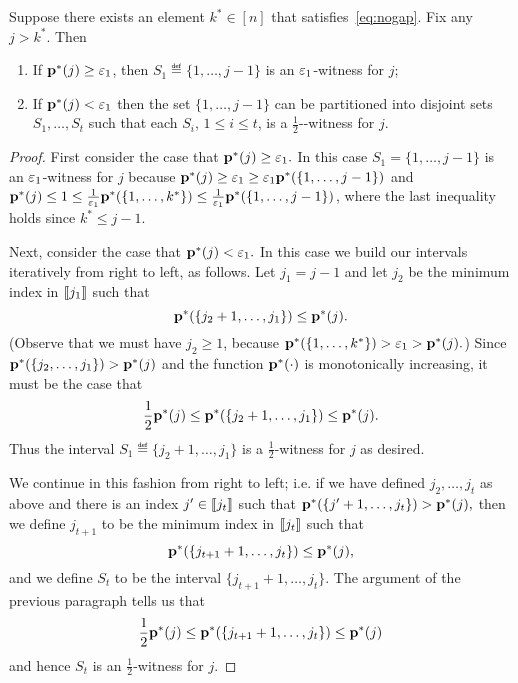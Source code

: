 \begin{claim} \label{claim:partition}
Suppose there exists an element $k^\ast \in [n]$
that satisfies~\cref{eq:nogap}.
Fix any $j > k^\ast.$  Then

\begin{enumerate}
\item If $\D^\ast(j) \geq {\eps_1}$, then $S_1 \eqdef \{1,\dots,j-1\}$ is an
${\varepsilon_1}$-\good witness for $j$;
\item If $\mathbf{p}^\ast(j) < {\varepsilon_1}$ then the set $\{1,\dots,j-1\}$ can be partitioned
into disjoint sets $S_1,\dots,S_t$ such that each
$S_i$, $1 \leq i \leq t$, is a ${\frac{1}2}$-\good-witness for $j$.
\end{enumerate}

\end{claim}
\begin{proof}
First consider the case that $\D^\ast(j)\geq {\eps_1}.$  In this case $S_1=\{1,\dots,j-1\}$  is an ${\varepsilon_1}$-\good witness
for $j$ because $\D^\ast(j) \geq {\eps_1} \geq {\eps_1} \D^\ast(\{1,\dots,j-1\})$
and $\D^\ast(j) \leq 1 \leq {\frac{1}{{\eps_1}}} \D^\ast(\{1,\dots,k^\ast\}) \leq {\frac{1}{{\eps_1}}} \D^\ast(\{1,\dots,j-1\})$,
where the last inequality holds since $k^\ast \leq j-1$.

Next, consider the case that $\mathbf{p}^\ast(j) < {\varepsilon_1}.$  In this case we build our
intervals iteratively from right to left, as follows.  Let $j_1=j-1$
and let $j_2$ be the minimum index in $\llbracket j_1\rrbracket$
such that
\[ \mathbf{p}^\ast(\{j_2+1,\dots,j_1\}) \leq \mathbf{p}^\ast(j). \]
(Observe that we must have $j_2 \geq 1$, because $\mathbf{p}^\ast(\{1,\dots,k^\ast\})
> {\varepsilon_1} > \mathbf{p}^\ast(j).$)  Since \mbox{$\mathbf{p}^\ast(\{j_2,\dots,j_1\}) > \mathbf{p}^\ast(j)$}
and the function $\mathbf{p}^\ast(\cdot)$ is monotonically increasing, it must be the
case that
\[
\frac{1}{2}\mathbf{p}^\ast(j) \leq \mathbf{p}^\ast(\{j_2+1,\dots,j_1\}) \leq \mathbf{p}^\ast(j).
\]
Thus the interval $S_1 \eqdef \{j_2+1,\dots,j_1\}$ is
a ${\frac{1}2}$-\good witness for $j$ as desired.

We continue in this fashion from right to left; i.e. if
we have defined $j_2,\dots,j_t$ as above and there is an index $j'
\in \llbracket j_t\rrbracket$ such that
$
\mathbf{p}^\ast(\{j'+1,\dots,j_t\}) > \mathbf{p}^\ast(j),
$
then we define $j_{t+1}$ to be the minimum index in $\llbracket j_t\rrbracket$
such that
\[
\mathbf{p}^\ast(\{j_{t+1}+1,\dots,j_t\}) \leq \mathbf{p}^\ast(j),
\]
and we define
$S_{t}$ to be the interval $\{j_{t+1}+1,\dots,j_t\}$.
The argument of the previous paragraph tells us that
\begin{equation} \label{eq:comp}
\frac{1}{2}\mathbf{p}^\ast(j) \leq
\mathbf{p}^\ast(\{j_{t+1}+1,\dots,j_t\}) \leq
\mathbf{p}^\ast(j)
\end{equation}
and hence $S_{t}$ is an ${\frac{1}2}$-\good witness for $j$.



\end{proof}
